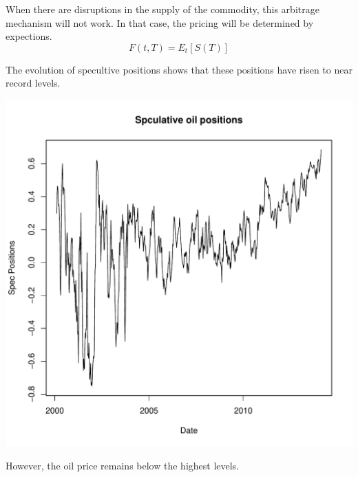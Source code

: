 \documentclass[12pt, a4paper, oneside]{article}\usepackage{graphicx, color}
\makeatletter
\def\maxwidth{ %
  \ifdim\Gin@nat@width>\linewidth
    \linewidth
  \else
    \Gin@nat@width
  \fi
}
\newenvironment{knitrout}{}{} %
\makeatother
\begin{document}
When there are disruptions in the supply of the commodity, this arbitrage mechanism will not work. In that case, the pricing will be determined by expections. 
\begin{equation*}
F(t, T) = E_t[S(T)]
\end{equation*}





The evolution of specultive positions shows that these positions have risen to near record levels.   
\begin{knitrout}
\color{fgcolor}

{\centering \includegraphics[width=\maxwidth]{figure/Oilspec} 

}



\end{knitrout}

However, the oil price remains below the highest levels. 
\end{document}
